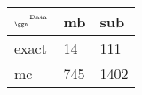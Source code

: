 \begin{tabular}{lll}
    \toprule
    $_{\text{\tiny{\ggn}}}$$^{\text{\tiny{Data}}}$ & mb & sub \\
    \midrule
    exact & 14
              & 111 \\
    mc   & 745
              & 1402 \\
    \bottomrule
\end{tabular}